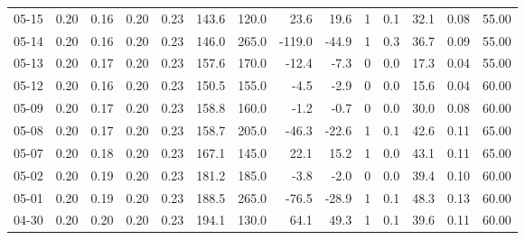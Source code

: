 \begin{threeparttable}
{\begin{tabular}{lrrrrrrrrrrrrr}
  05-15 &          0.20 &          0.16 &          0.20 &        0.23 &               143.6 &               120.0 &       23.6 &         19.6 &              1 &                 0.1 &             32.1 &            0.08 &                  55.00 \\
  05-14 &          0.20 &          0.16 &          0.20 &        0.23 &               146.0 &               265.0 &     -119.0 &        -44.9 &              1 &                 0.3 &             36.7 &            0.09 &                  55.00 \\
  05-13 &          0.20 &          0.17 &          0.20 &        0.23 &               157.6 &               170.0 &      -12.4 &         -7.3 &              0 &                 0.0 &             17.3 &            0.04 &                  55.00 \\
  05-12 &          0.20 &          0.16 &          0.20 &        0.23 &               150.5 &               155.0 &       -4.5 &         -2.9 &              0 &                 0.0 &             15.6 &            0.04 &                  60.00 \\
  05-09 &          0.20 &          0.17 &          0.20 &        0.23 &               158.8 &               160.0 &       -1.2 &         -0.7 &              0 &                 0.0 &             30.0 &            0.08 &                  60.00 \\
  05-08 &          0.20 &          0.17 &          0.20 &        0.23 &               158.7 &               205.0 &      -46.3 &        -22.6 &              1 &                 0.1 &             42.6 &            0.11 &                  65.00 \\
  05-07 &          0.20 &          0.18 &          0.20 &        0.23 &               167.1 &               145.0 &       22.1 &         15.2 &              1 &                 0.0 &             43.1 &            0.11 &                  65.00 \\
  05-02 &          0.20 &          0.19 &          0.20 &        0.23 &               181.2 &               185.0 &       -3.8 &         -2.0 &              0 &                 0.0 &             39.4 &            0.10 &                  60.00 \\
  05-01 &          0.20 &          0.19 &          0.20 &        0.23 &               188.5 &               265.0 &      -76.5 &        -28.9 &              1 &                 0.1 &             48.3 &            0.13 &                  60.00 \\
  04-30 &          0.20 &          0.20 &          0.20 &        0.23 &               194.1 &               130.0 &       64.1 &         49.3 &              1 &                 0.1 &             39.6 &            0.11 &                  60.00 \\

\end{tabular}}
\end{threeparttable}
